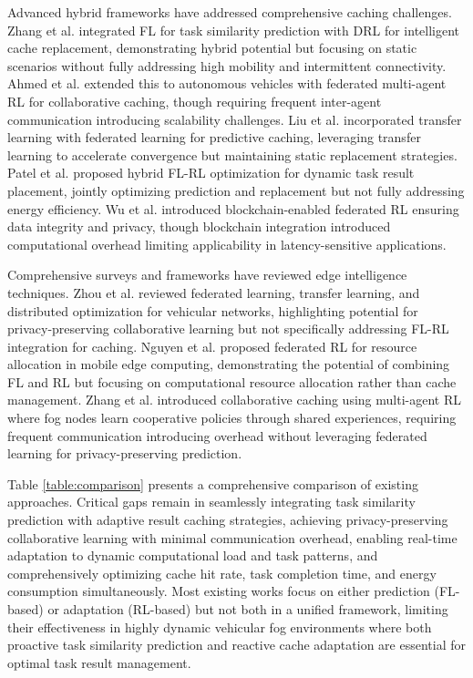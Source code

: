 Advanced hybrid frameworks have addressed comprehensive caching challenges. Zhang et al. \cite{zhang2025intelligent} integrated FL for task similarity prediction with DRL for intelligent cache replacement, demonstrating hybrid potential but focusing on static scenarios without fully addressing high mobility and intermittent connectivity. Ahmed et al. \cite{ahmed2025collaborative} extended this to autonomous vehicles with federated multi-agent RL for collaborative caching, though requiring frequent inter-agent communication introducing scalability challenges. Liu et al. \cite{liu2025predictive} incorporated transfer learning with federated learning for predictive caching, leveraging transfer learning to accelerate convergence but maintaining static replacement strategies. Patel et al. \cite{patel2025dynamic} proposed hybrid FL-RL optimization for dynamic task result placement, jointly optimizing prediction and replacement but not fully addressing energy efficiency. Wu et al. \cite{wu2025secure} introduced blockchain-enabled federated RL ensuring data integrity and privacy, though blockchain integration introduced computational overhead limiting applicability in latency-sensitive applications.

Comprehensive surveys and frameworks have reviewed edge intelligence techniques. Zhou et al. \cite{zhou2019edge} reviewed federated learning, transfer learning, and distributed optimization for vehicular networks, highlighting potential for privacy-preserving collaborative learning but not specifically addressing FL-RL integration for caching. Nguyen et al. \cite{nguyen2021federated} proposed federated RL for resource allocation in mobile edge computing, demonstrating the potential of combining FL and RL but focusing on computational resource allocation rather than cache management. Zhang et al. \cite{zhang2022collaborative} introduced collaborative caching using multi-agent RL where fog nodes learn cooperative policies through shared experiences, requiring frequent communication introducing overhead without leveraging federated learning for privacy-preserving prediction.

Table \ref{table:comparison} presents a comprehensive comparison of existing approaches. Critical gaps remain in seamlessly integrating task similarity prediction with adaptive result caching strategies, achieving privacy-preserving collaborative learning with minimal communication overhead, enabling real-time adaptation to dynamic computational load and task patterns, and comprehensively optimizing cache hit rate, task completion time, and energy consumption simultaneously. Most existing works focus on either prediction (FL-based) or adaptation (RL-based) but not both in a unified framework, limiting their effectiveness in highly dynamic vehicular fog environments where both proactive task similarity prediction and reactive cache adaptation are essential for optimal task result management.

